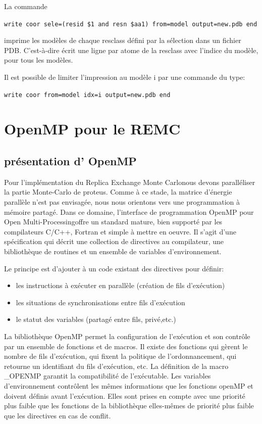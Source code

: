 La commande 

\verb!write coor sele=(resid $1 and resn $aa1) from=model output=new.pdb end!

imprime les modèles de chaque resclass défini par la sélection dans un fichier PDB. C'est-à-dire écrit une ligne par atome de la resclass avec l'indice du modèle, pour tous les modèles. 

Il est possible de limiter l'impression au modèle i par une commande du type:

\verb!write coor from=model idx=i output=new.pdb end!


\section{OpenMP pour le REMC}
\subsection{présentation d' OpenMP}

Pour l'implémentation du \og Replica Exchange Monte Carlo\fg nous devons paralléliser la partie Monte-Carlo de proteus. Comme à ce stade, la matrice d'énergie parallèle n'est pas envisagée, nous nous orientons vers une programmation à mémoire partagé. Dans ce domaine, l'interface de programmation OpenMP pour \og Open Multi-Processing\fg  offre un standard mature, bien supporté par les compilateurs C/C++, Fortran et simple à mettre en oeuvre. Il s'agit d'une spécification qui décrit une collection de directives au compilateur, une bibliothèque de routines et un ensemble de variables d'environnement. 


Le principe est d'ajouter à un code existant des directives pour définir:

\begin{itemize}
\item les instructions à exécuter en parallèle (création de fils d'exécution)
\item les situations de synchronisations entre fils d'exécution
\item le statut des variables (partagé entre fils, privé,etc.) 
\end{itemize}

La bibliothèque OpenMP permet la configuration de l'exécution et son contrôle par un ensemble de fonctions et de macros. Il existe des fonctions qui gèrent le nombre de fils d'exécution, qui fixent la politique de l'ordonnancement, qui retourne un identifiant du fils d'exécution, etc. La définition de la macro \_OPENMP garantit la compatibilité de l'exécutable.
Les variables d'environnement contrôlent les mêmes informations que les fonctions openMP et doivent définis avant l'exécution. Elles sont prises en compte avec une priorité plus faible que les fonctions de la bibliothèque elles-mêmes de priorité plus faible que les directives en cas de conflit.

